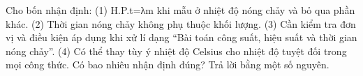 \begin{ex}
Cho bốn nhận định: (1) H.P.t=λm khi mẫu ở nhiệt độ nóng chảy và bỏ qua phần khác. (2) Thời gian nóng chảy không phụ thuộc khối lượng. (3) Cần kiểm tra đơn vị và điều kiện áp dụng khi xử lí dạng “Bài toán công suất, hiệu suất và thời gian nóng chảy”. (4) Có thể thay tùy ý nhiệt độ Celsius cho nhiệt độ tuyệt đối trong mọi công thức. Có bao nhiêu nhận định đúng? Trả lời bằng một số nguyên.
\end{ex}
